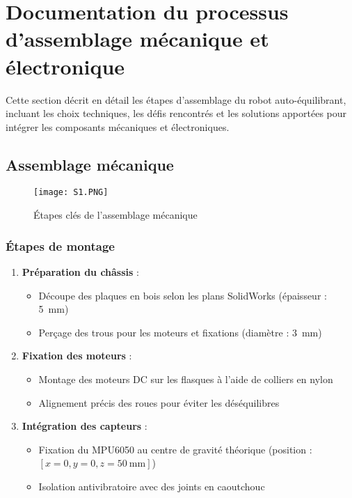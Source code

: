 \documentclass{report}
\begin{document}
\section{Documentation du processus d’assemblage mécanique et électronique}
\label{sec:assemblage}

Cette section décrit en détail les étapes d’assemblage du robot auto-équilibrant, incluant les choix techniques, les défis rencontrés et les solutions apportées pour intégrer les composants mécaniques et électroniques.

\subsection{Assemblage mécanique}
\label{subsec:assemblage_meca}

\begin{figure}[htbp]
    \centering
    \texttt{[image: S1.PNG]}
    \caption{Étapes clés de l’assemblage mécanique}
    \label{fig:assemblage_meca}
\end{figure}

\subsubsection{Étapes de montage}
\begin{enumerate}
    \item \textbf{Préparation du châssis} :
    \begin{itemize}
        \item Découpe des plaques en bois selon les plans SolidWorks (épaisseur : \SI{5}{mm})
        \item Perçage des trous pour les moteurs et fixations (diamètre : \SI{3}{mm})
    \end{itemize}
    
    \item \textbf{Fixation des moteurs} :
    \begin{itemize}
        \item Montage des moteurs DC sur les flasques à l’aide de colliers en nylon
        \item Alignement précis des roues pour éviter les déséquilibres
    \end{itemize}
    
    \item \textbf{Intégration des capteurs} :
    \begin{itemize}
        \item Fixation du MPU6050 au centre de gravité théorique (position : $[x=0, y=0, z=50\ \text{mm}]$)
        \item Isolation antivibratoire avec des joints en caoutchouc
    \end{itemize}
\end{enumerate}
\end{document}
